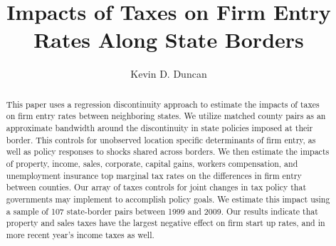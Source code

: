 \documentclass[12pt,a4paper]{article}
\renewcommand{\baselinestretch}{2}
\begin{document}
\title{Impacts of Taxes on Firm Entry Rates Along State Borders}
\author{Kevin D. Duncan}
\date{}
\maketitle

\begin{abstract}
This paper uses a regression discontinuity approach to estimate the impacts of taxes on firm entry rates between neighboring states. We utilize matched county pairs as an approximate bandwidth around the discontinuity in state policies imposed at their border. This controls for unobserved location specific determinants of firm entry, as well as policy responses to shocks shared across borders. We then estimate the impacts of property, income, sales, corporate, capital gains, workers compensation, and unemployment insurance top marginal tax rates on the differences in firm entry between counties. Our array of taxes controls for joint changes in tax policy that governments may implement to accomplish policy goals. We estimate this impact using a sample of 107 state-border pairs between 1999 and 2009. Our results indicate that property and sales taxes have the largest negative effect on firm start up rates, and in more recent year's income taxes as well.
\end{abstract}

\newpage








\renewcommand{\baselinestretch}{1.0} 
\end{document}

